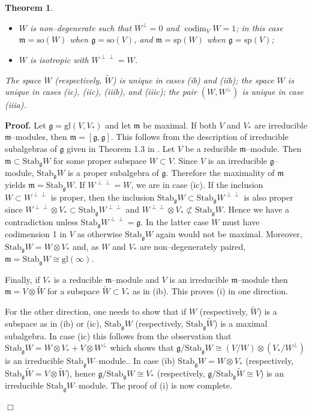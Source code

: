 \documentclass[oneside,leqno,12pt]{article}
\newcounter{theorem}
\newtheorem{theo}{Theorem}[section]
\newenvironment{proof}{ \noindent \textbf{Proof.}}{\hfill $\Box$}
\def\gg{\mathfrak{g}}
\def\gm{\mathfrak{m}}
\DeclareMathOperator{\codim}{codim}
\newcommand{\mm}{\mathfrak{m}}
\renewcommand{\gg}{\mathfrak{g}}
\newcommand{\Stab}{\mathrm{Stab}}
\renewcommand{\sp}{\mathrm{sp}}
\newcommand{\gl}{\mathrm{gl}}
\newcommand{\so}{\mathrm{so}}
\begin{document}
\begin{theo}
\begin{itemize}
\begin{itemize}
in this case $\gm = \so(W) \oplus \so(W^\perp)$ when $\gg = \so(V)$, and 
 $\gm = \sp(W) \oplus \sp(W^\perp)$ when $\gg = \sp(V)$;
\item[\rm{(iiib)}] $W$ is non--degenerate such that $W^\perp = 0$ and $\codim_V W = 1$; 
in this case $\gm = \so(W)$ when $\gg = \so(V)$, and 
$\gm = \sp(W)$ when $\gg = \sp(V)$;
\item[\rm{(iiic)}]  $W$ is isotropic with $W^{\perp \perp} = W$.
\end{itemize}
\end{itemize}
The space $W$ (respectively, $\tilde{W}$) is unique in cases {\rm {(ib) and (iib)}}; the space $W$ is unique in cases {\rm {(ic), (iic), (iiib), and (iiic)}};
the pair $(W, W^\perp)$ is unique in case {\rm {(iiia)}}.
\end{theo}
\begin{proof}
Let $\gg=\gl(V, V_*)$ and let $\gm$ be maximal. 
If both $V$ and $V_*$ are irreducible $\gm$--modules, then $\gm = [\gg, \gg]$. This follows from the description of irreducible subalgebras of $\gg$ 
given in Theorem 1.3 in \cite{BS}.
Let $V$ be a reducible $\gm$--module. 
Then $\mm \subset \Stab_\gg W$ for some proper subspace $W\subset V$. 
 Since $V$ is an irreducible $\gg$--module, 
$\Stab_\gg W$ is a proper subalgebra of $\gg$. Therefore the maximality of $\mm$ yields 
$\mm=\Stab_\gg W$. If $W^{\perp\perp}=W$, we are in case (ic). If the inclusion 
$W\subset W^{\perp\perp}$ is proper, then the inclusion $\Stab_\gg W\subset\Stab_\gg W^{\perp\perp}$ is 
also proper since $W^{\perp\perp} \otimes V_* \subset \Stab_\gg W^{\perp \perp}$ and 
$W^{\perp\perp} \otimes V_* \not \subset \Stab_\gg W$. Hence we have a contradiction unless 
$\Stab_\gg W^{\perp\perp}=\gg$. In the latter case $W$ must have codimension 1 in 
$V$ as otherwise $\Stab_\gg W$ again would not be maximal.
Moreover, $\Stab_\gg W = W \otimes V_*$ and, as $W$ and $V_*$ are non--degenerately paired, $\gm = \Stab_\gg W \cong \gl(\infty)$.

Finally, if $V_*$ is a reducible $\gm$--module and $V$ is an irreducible $\gm$--module then $\gm = V \otimes \tilde{W}$ for
a subspace $\tilde{W} \subset V_*$ as in (ib). 
This proves (i) in one direction. 

For the other direction, one needs to show that if $W$ (respectively, $\tilde{W}$) is a subspace as in (ib) or (ic), $\Stab_\gg W$ (respectively, 
$\Stab_\gg \tilde{W}$) is a maximal subalgebra. In case (ic) this 
follows from the observation that  $\Stab_\gg W = W \otimes V_* + V \otimes W^\perp$
which shows that $\gg/\Stab_\gg W \cong (V/W) \otimes (V_*/W^\perp)$ is an irreducible $\Stab_\gg W$--module.. In case (ib)  
$\Stab_\gg W = W \otimes V_*$ (respectively, $\Stab_\gg \tilde{W} = V \otimes \tilde{W}$), hence 
$\gg/\Stab_\gg W \cong V_*$ (respectively, $\gg/\Stab_\gg \tilde{W} \cong V$) 
is an irreducible $\Stab_\gg W$--module. The proof of (i) is now complete.



\end{proof}
\end{document}
